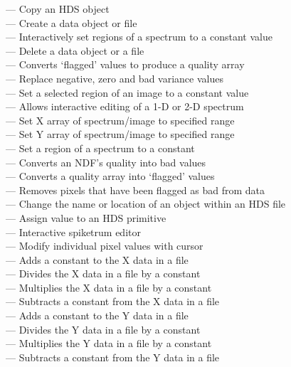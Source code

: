  --- Copy an HDS object\\
 --- Create a data object or file\\
 --- Interactively set regions of a spectrum to a constant value\\
 --- Delete a data object or a file\\
 --- Converts `flagged' values to produce a quality array\\
 --- Replace negative, zero and bad variance values\\
 --- Set a selected region of an image to a constant value\\
 --- Allows interactive editing of a 1-D or 2-D spectrum\\
 --- Set X array of spectrum/image to specified range\\
 --- Set Y array of spectrum/image to specified range\\
 --- Set a region of a spectrum to a constant\\
 --- Converts an NDF's quality into bad values\\
 --- Converts a quality array into `flagged' values\\
 --- Removes pixels that have been flagged as bad from data\\
 --- Change the name or location of an object within an HDS file\\
 --- Assign value to an HDS primitive\\
 --- Interactive spiketrum editor\\
 --- Modify individual pixel values with cursor\\
 --- Adds a constant to the X data in a file\\
 --- Divides the X data in a file by a constant\\
 --- Multiplies the X data in a file by a constant\\
 --- Subtracts a constant from the X data in a file\\
 --- Adds a constant to the Y data in a file\\
 --- Divides the Y data in a file by a constant\\
 --- Multiplies the Y data in a file by a constant\\
 --- Subtracts a constant from the Y data in a file

